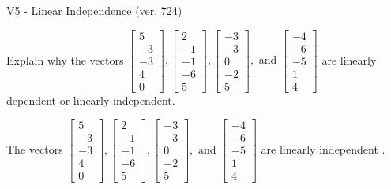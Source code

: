 \begin{exercise}
  \begin{exerciseTitle}V5 - Linear Independence (ver. 724)\end{exerciseTitle}
  \begin{exerciseStatement}
    Explain why the vectors \(\left[\begin{array}{r}
5 \\
-3 \\
-3 \\
4 \\
0
\end{array}\right] , \left[\begin{array}{r}
2 \\
-1 \\
-1 \\
-6 \\
5
\end{array}\right] , \left[\begin{array}{r}
-3 \\
-3 \\
0 \\
-2 \\
5
\end{array}\right] , \text{ and } \left[\begin{array}{r}
-4 \\
-6 \\
-5 \\
1 \\
4
\end{array}\right]\) are linearly dependent or linearly independent.	


  \end{exerciseStatement}
  \begin{exerciseAnswer}
   The vectors \(\left[\begin{array}{r}
5 \\
-3 \\
-3 \\
4 \\
0
\end{array}\right] , \left[\begin{array}{r}
2 \\
-1 \\
-1 \\
-6 \\
5
\end{array}\right] , \left[\begin{array}{r}
-3 \\
-3 \\
0 \\
-2 \\
5
\end{array}\right] , \text{ and } \left[\begin{array}{r}
-4 \\
-6 \\
-5 \\
1 \\
4
\end{array}\right]\) are 
  	 linearly independent  .
  


  \end{exerciseAnswer}
\end{exercise}